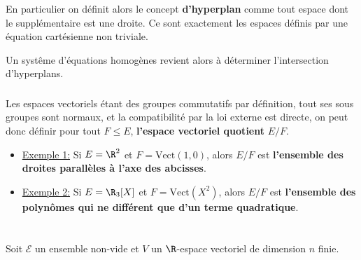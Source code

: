 \subsection*{}
En particulier on définit alors le concept \textbf{d'hyperplan} comme tout espace dont le supplémentaire est une droite. Ce sont exactement les espaces définis par une équation cartésienne non triviale.\<

Un systême d'équations homogènes revient alors à déterminer l'intersection d'hyperplans.
\subsection*{}
Les espaces vectoriels étant des groupes commutatifs par définition, tout ses sous groupes sont normaux, et la compatibilité par la loi externe est directe, on peut donc définir pour tout \( F \leq E \), \textbf{l'espace vectoriel quotient} \( E/F \).
\begin{itemize}
   \item \uline{Exemple 1:} Si \( E = \R^2 \) et \( F = \text{Vect}(1, 0) \), alors \( E/F \) est \textbf{l'ensemble des droites parallèles à l'axe des abcisses}.
   \item \uline{Exemple 2:} Si \( E = \R_3[X] \) et \( F = \text{Vect}(X^2) \), alors \( E/F \) est \textbf{l'ensemble des polynômes qui ne différent que d'un terme quadratique}.
\end{itemize}
\chapter*{} %
Soit \(\mathscr{E}\) un ensemble non-vide et \(V\) un \(\R\)-espace vectoriel de dimension \(n\) finie.
